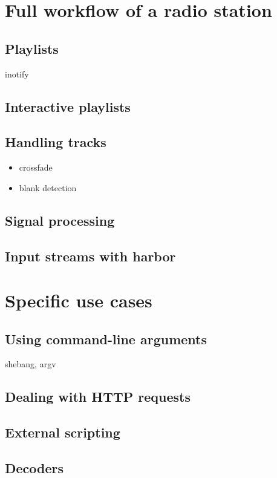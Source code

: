 \documentclass{book}
\begin{document}
\chapter{Full workflow of a radio station}
\section{Playlists}

inotify

\section{Interactive playlists}

\section{Handling tracks}
\begin{itemize}
\item crossfade
\item blank detection
\end{itemize}

\section{Signal processing}

\section{Input streams with harbor}

\chapter{Specific use cases}
\section{Using command-line arguments}
shebang, argv

\section{Dealing with HTTP requests}

\section{External scripting}

\section{Decoders}
\end{document}
